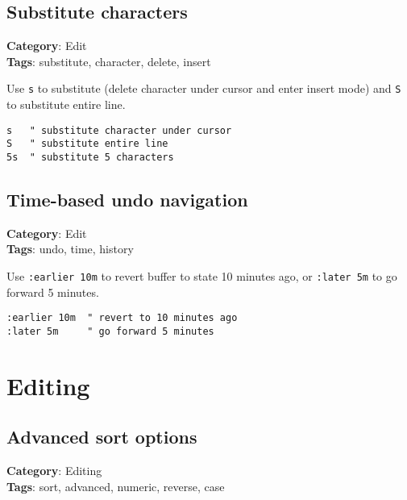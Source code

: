 {{{{\section{Substitute characters}

\textbf{Category}: Edit\\ \textbf{Tags}: substitute, character, delete, insert
\vspace{0.5cm}

Use {\footnotesize \Verb§s§} to substitute (delete character under cursor and enter insert mode) and {\footnotesize \Verb§S§} to substitute entire line.

\begin{Exa*}{}
\begin{Verbatim}[fontsize=\footnotesize, breaklines, breakanywhere]
s   " substitute character under cursor
S   " substitute entire line
5s  " substitute 5 characters
\end{Verbatim}
\end{Exa*}

\section{Time-based undo navigation}

\textbf{Category}: Edit\\ \textbf{Tags}: undo, time, history
\vspace{0.5cm}

Use {\footnotesize \Verb§:earlier 10m§} to revert buffer to state 10 minutes ago, or {\footnotesize \Verb§:later 5m§} to go forward 5 minutes.

\begin{Exa*}{}
\begin{Verbatim}[fontsize=\footnotesize, breaklines, breakanywhere]
:earlier 10m  " revert to 10 minutes ago
:later 5m     " go forward 5 minutes
\end{Verbatim}
\end{Exa*}

\chapter{Editing}
\section{Advanced sort options}

\textbf{Category}: Editing\\ \textbf{Tags}: sort, advanced, numeric, reverse, case
\vspace{0.5cm}

}}}}

